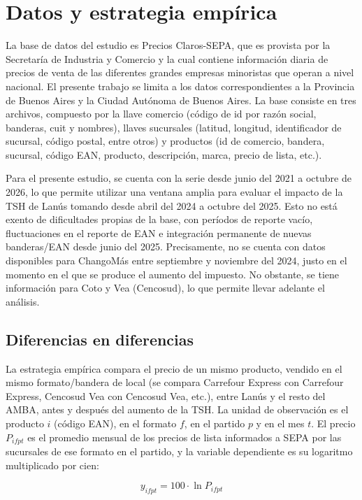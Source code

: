 \section{Datos y estrategia empírica}

La base de datos del estudio es Precios Claros-SEPA, que es provista por la Secretaría de Industria y Comercio y la cual contiene información diaria de precios de venta de las diferentes grandes empresas minoristas que operan a nivel nacional. El presente trabajo se limita a los datos correspondientes a la Provincia de Buenos Aires y la Ciudad Autónoma de Buenos Aires. La base consiste en tres archivos, compuesto por la llave comercio (código de id por razón social, banderas, cuit y nombres), llaves sucursales (latitud, longitud, identificador de sucursal, código postal, entre otros) y productos (id de comercio, bandera, sucursal, código EAN, producto, descripción, marca, precio de lista, etc.).

Para el presente estudio, se cuenta con la serie desde junio del 2021 a octubre de 2026, lo que permite utilizar una ventana amplia para evaluar el impacto de la TSH de Lanús tomando desde abril del 2024 a octubre del 2025. Esto no está exento de dificultades propias de la base, con períodos de reporte vacío, fluctuaciones en el reporte de EAN e integración permanente de nuevas banderas/EAN desde junio del 2025. Precisamente, no se cuenta con datos disponibles para ChangoMás entre septiembre y noviembre del 2024, justo en el momento en el que se produce el aumento del impuesto. No obstante, se tiene información para Coto y Vea (Cencosud), lo que permite llevar adelante el análisis.

\subsection{Diferencias en diferencias}

La estrategia empírica compara el precio de un mismo producto, vendido en el mismo formato/bandera de local (se compara Carrefour Express con Carrefour Express, Cencosud Vea con Cencosud Vea, etc.), entre Lanús y el resto del AMBA, antes y después del aumento de la TSH. La unidad de observación es el producto \(i\) (código EAN), en el formato \(f\), en el partido \(p\) y en el mes \(t\). El precio \(P_{ifpt}\) es el promedio mensual de los precios de lista informados a SEPA por las sucursales de ese formato en el partido, y la variable dependiente es su logaritmo multiplicado por cien:

\begin{equation}\label{eq:1}
  y_{ifpt} = 100 \cdot \ln P_{ifpt}
\end{equation}

